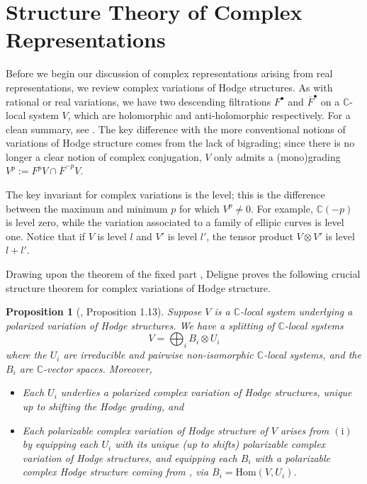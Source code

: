 \documentclass[12pt]{amsart}
\newcommand{\C}{\mathbb{C}}
\newtheorem{proposition}[theorem]{Proposition}
\theoremstyle{definition}
\theoremstyle{remark}
\numberwithin{equation}{section}
\begin{document}
\section{Structure Theory of Complex Representations}

Before we begin our discussion of complex representations arising from real 
representations, we review complex variations of Hodge structures. As with 
rational or real variations, we have two descending filtrations \(F^\bullet\)
and \(\overline{F}^\bullet\) on a \(\C\)-local system \(V\), which are holomorphic and 
anti-holomorphic respectively. For a clean summary, see \cite{bak22}. The key
difference with the more conventional notions of variations of Hodge structure 
comes from the lack of bigrading; since there is no longer a clear notion of 
complex conjugation, \(V\) only admits a (mono)grading 
\(V^p := F^p V \cap \overline{F}^{-p} V\).

The key invariant for complex variations is the level; this is the 
difference between the maximum and minimum \(p\) for which \(V^p \neq 0\). For
example, \(\C(-p)\) is level zero, while the variation associated to a family of 
ellipic curves is level one. Notice that if \(V\) is level \(l\) and 
\(V'\) is level \(l'\), the tensor product \(V \otimes V'\) is level \(l + l'\).

Drawing upon the theorem of the fixed part \cite{schmid73}, Deligne proves the 
following crucial structure theorem for complex variations of Hodge structure.

\begin{proposition}[\cite{del87}, Proposition 1.13]\label{deligne-structure-theorem}
    Suppose $V$ is a $\C$-local system underlying a polarized variation of Hodge 
    structures. We have a splitting of $\C$-local systems
    \begin{equation}
        \label{prime-factorization}
        V = \bigoplus_i B_i \otimes U_i
    \end{equation}
    where the $U_i$ are irreducible and pairwise non-isomorphic $\C$-local systems,
    and the $B_i$ are $\C$-vector spaces. Moreover,
    \begin{itemize}
        \item[(i)] Each $U_i$ underlies a polarized complex variation of Hodge 
        structures, unique up to shifting the Hodge grading, and
        \item[(ii)] Each polarizable complex variation of Hodge structure of \(V\) 
        arises from \(\mathrm{(i)}\) by equipping each $U_i$ with its unique (up to shifts) polarizable complex
        variation of Hodge structures, and equipping each $B_i$ with a polarizable
        complex Hodge structure coming from \cite{schmid73}, via
        $B_i = \mathrm{Hom}(V, U_i)$.
    \end{itemize}
\end{proposition}
\end{document}
